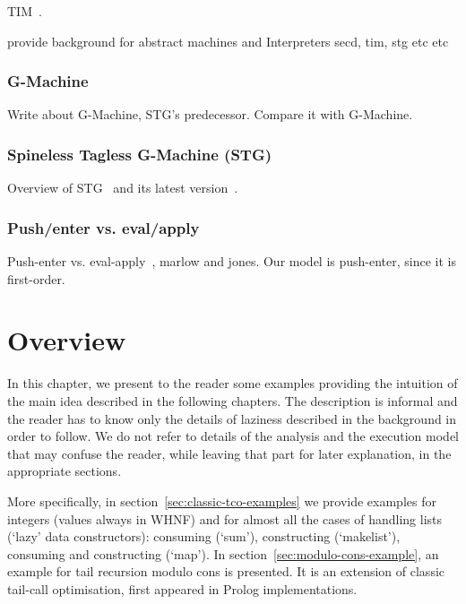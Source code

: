 \documentclass[diploma]{softlab-thesis}
\begin{document}
TIM~\cite{Argo89}.

provide background for abstract machines and Interpreters
secd, tim, stg etc etc

\subsection{G-Machine}
\label{sec:g-machine}
Write about G-Machine, STG's predecessor. Compare it with G-Machine.

\subsection{Spineless Tagless G-Machine (STG)}
\label{sec:stg}
Overview of STG~\cite{Jo92} and its latest version~\cite{Ma06}.

\subsection{Push/enter vs. eval/apply}
\label{sec:push-enter}
Push-enter vs. eval-apply~\cite{Ma06}, marlow and jones. Our model is push-enter, since it is first-order.






\chapter {Overview}
\label{ch:overview}

In this chapter, we present to the reader some examples providing the intuition of the main idea described 
in the following chapters. The description is informal and the reader has to know only the details of laziness 
described in the background in order to follow. We do not refer to details of the analysis and the execution model 
that may confuse the reader, while leaving that part for later explanation, in the appropriate sections.

More specifically, in section~\ref{sec:classic-tco-examples} we provide examples for integers (values always in WHNF) and 
for almost all the cases of handling lists (`lazy' data constructors): 
consuming (`sum'), constructing (`makelist'), consuming and constructing (`map'). 
In section~\ref{sec:modulo-cons-example}, an example for tail recursion modulo cons is presented. It is an extension of classic 
tail-call optimisation, first appeared in Prolog implementations.
\end{document}

